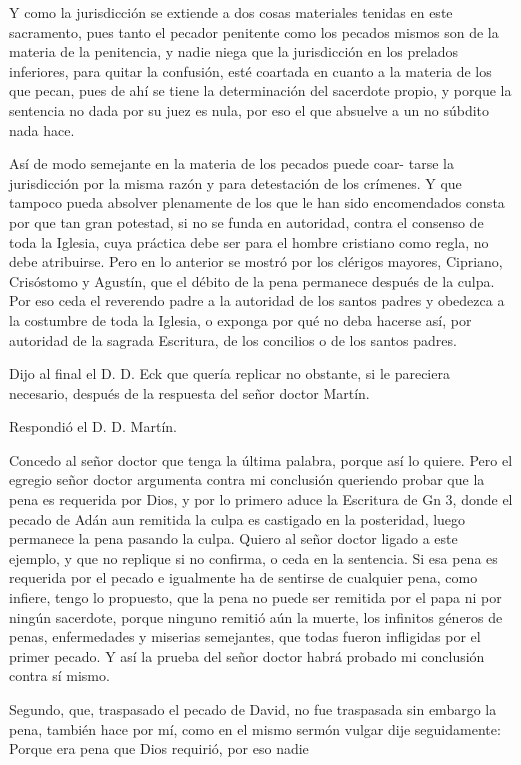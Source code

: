 Y como la jurisdicción se extiende a dos cosas materiales tenidas en este sacramento, pues tanto el pecador penitente como los pecados mismos son de la materia de la penitencia, y nadie niega que la jurisdicción en los prelados inferiores, para quitar la confusión, esté coartada en cuanto a la materia de los que pecan, pues de ahí se tiene la determinación del sacerdote propio, y porque la sentencia no dada por su juez es nula, por eso el que absuelve a un no súbdito nada hace.

Así de modo semejante en la materia de los pecados puede coar- \marginpar{\small[376]} tarse la jurisdicción por la misma razón y para detestación de los crímenes. Y que tampoco pueda absolver plenamente de los que le han sido encomendados consta por que tan gran potestad, si no se funda en autoridad, contra el consenso de toda la Iglesia, cuya práctica debe ser para el hombre cristiano como regla, no debe atribuirse. Pero en lo anterior se mostró por los clérigos mayores, Cipriano, Crisóstomo y Agustín, que el débito de la pena permanece después de la culpa. Por eso ceda el reverendo padre a la autoridad de los santos padres y obedezca a la costumbre de toda la Iglesia, o exponga por qué no deba hacerse así, por autoridad de la sagrada Escritura, de los concilios o de los santos padres.

Dijo al final el D. D. Eck que quería replicar no obstante, si le pareciera necesario, después de la respuesta del señor doctor Martín.

Respondió el D. D. Martín.

Concedo al señor doctor que tenga la última palabra, porque así lo quiere. Pero el egregio señor doctor argumenta contra mi conclusión queriendo probar que la pena es requerida por Dios, y por lo primero aduce la Escritura de Gn 3, donde el pecado de Adán aun remitida la culpa es castigado en la posteridad, luego permanece la pena pasando la culpa. Quiero al señor doctor ligado a este ejemplo, y que no replique si no confirma, o ceda en la sentencia. Si esa pena es requerida por el pecado e igualmente ha de sentirse de cualquier pena, como infiere, tengo lo propuesto, que la pena no puede ser remitida por el papa ni por ningún sacerdote, porque ninguno remitió aún la muerte, los infinitos géneros de penas, enfermedades y miserias semejantes, que todas fueron infligidas por el primer pecado. Y así la prueba del señor doctor habrá probado mi conclusión contra sí mismo.

Segundo, que, traspasado el pecado de David, no fue traspasada sin embargo la pena, también hace por mí, como en el mismo sermón vulgar dije seguidamente: Porque era pena que Dios requirió, por eso nadie

